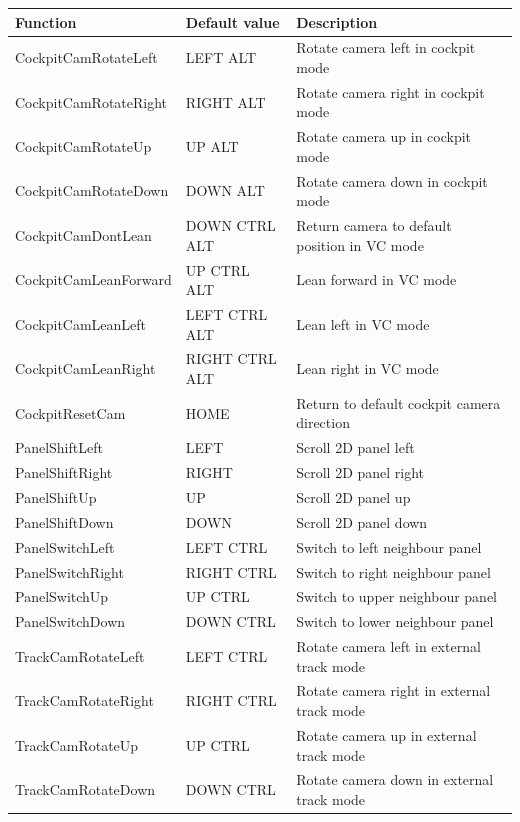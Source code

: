 \documentclass[Orbiter User Manual.tex]{subfiles}
\begin{document}
	\footnotesize
	\begin{longtable}{ p{} p{} p{} }
	\hline
	\textbf{Function} & \textbf{Default value} & \textbf{Description}\\
	\hline
	CockpitCamRotateLeft & LEFT ALT & Rotate camera left in cockpit mode\\
	\hline
	CockpitCamRotateRight & RIGHT ALT & Rotate camera right in cockpit mode\\
	\hline
	CockpitCamRotateUp & UP ALT & Rotate camera up in cockpit mode\\
	\hline
	CockpitCamRotateDown & DOWN ALT & Rotate camera down in cockpit mode\\
	\hline
	CockpitCamDontLean & DOWN CTRL ALT & Return camera to default position in VC
		mode\\
	\hline
	CockpitCamLeanForward & UP CTRL ALT & Lean forward in VC mode\\
	\hline
	CockpitCamLeanLeft & LEFT CTRL ALT & Lean left in VC mode\\
	\hline
	CockpitCamLeanRight & RIGHT CTRL ALT & Lean right in VC mode\\
	\hline
	CockpitResetCam & HOME & Return to default cockpit camera direction\\
	\hline
	PanelShiftLeft & LEFT & Scroll 2D panel left\\
	\hline
	PanelShiftRight & RIGHT & Scroll 2D panel right\\
	\hline
	PanelShiftUp & UP & Scroll 2D panel up\\
	\hline
	PanelShiftDown & DOWN & Scroll 2D panel down\\
	\hline
	PanelSwitchLeft & LEFT CTRL & Switch to left neighbour panel\\
	\hline
	PanelSwitchRight & RIGHT CTRL & Switch to right neighbour panel\\
	\hline
	PanelSwitchUp & UP CTRL & Switch to upper neighbour panel\\
	\hline
	PanelSwitchDown & DOWN CTRL & Switch to lower neighbour panel\\
	\hline
	TrackCamRotateLeft & LEFT CTRL & Rotate camera left in external track mode\\
	\hline
	TrackCamRotateRight & RIGHT CTRL & Rotate camera right in external track
		mode\\
	\hline
	TrackCamRotateUp & UP CTRL & Rotate camera up in external track mode\\
	\hline
	TrackCamRotateDown & DOWN CTRL & Rotate camera down in external track mode\\

\end{longtable}
\end{document}
